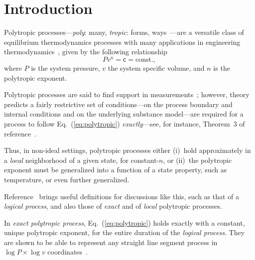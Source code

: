 \section{Introduction}

    Polytropic        processes---\emph{poly}:        many,        \emph{tropic}:         forms,
    ways~\cite{2020-NaaktgeborenC-engrXiv}---are a versatile class of equilibrium thermodynamics
    processes          with          many          applications          in          engineering
    thermodynamics~\cite{2002-MoranMJ+ShapiroHN-LTC,                 2013-CengelYA+BolesMA-AMGH,
    2015-KroosKA+PotterMC-Cengage,  1986-JonesJB+HawkinsGA-Wiley},  given   by   the   following
    relationship
    \begin{equation}
        Pv^n = \mathsf{c} = \mbox{const.},
        \label{eq:polytropic}
    \end{equation}
    \noindent where $P$ is the system pressure, $v$ the system specific volume, and $n$  is  the
    polytropic exponent.

    Polytropic       processes       are       said       to       find        support        in
    measurements~\cite{2013-CengelYA+BolesMA-AMGH,                   2002-MoranMJ+ShapiroHN-LTC,
    1985-WylenG-Wiley};         however,          theory~\cite{2012-ChristiansJ-IntJMechEngEduc,
    2020-NaaktgeborenC-engrXiv} predicts a fairly restrictive set of conditions---on the process
    boundary and internal conditions and on the underlying substance model---are required for  a
    process to follow Eq.~(\ref{eq:polytropic}) \emph{exactly}---see, for instance, Theorem~3 of
    reference~\cite{2020-NaaktgeborenC-engrXiv}.

    Thus, in non-ideal  settings,  polytropic  processes  either  (i)~hold  approximately  in  a
    \emph{local} neighborhood of  a  given  state,  for  constant-$n$,  or  (ii)~the  polytropic
    exponent must be generalized into a function of a state property, such  as  temperature,  or
    even further generalized.

    Reference~\cite{2020-NaaktgeborenC-engrXiv} brings useful definitions for  discussions  like
    this, such as that of a \emph{logical process},  and  also  those  of  \emph{exact}  and  of
    \emph{local} polytropic processes.

    In \emph{exact polytropic process}, Eq.~(\ref{eq:polytropic}) holds exactly with a constant,
    unique polytropic exponent, for the entire duration of the \emph{logical process}. They  are
    shown to be able to represent any straight line segment process in $\log P  \times  \log  v$
    coordinates~\cite{2020-NaaktgeborenC-engrXiv}.

